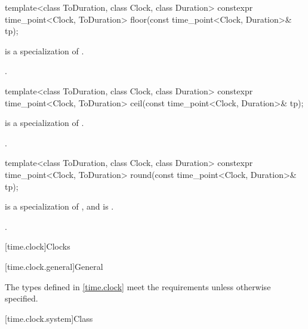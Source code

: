 %
\begin{itemdecl}
template<class ToDuration, class Clock, class Duration>
  constexpr time_point<Clock, ToDuration> floor(const time_point<Clock, Duration>& tp);
\end{itemdecl}

\begin{itemdescr}
\pnum
\constraints
{} is a specialization of .

\pnum
\returns
{}.
\end{itemdescr}

%
\begin{itemdecl}
template<class ToDuration, class Clock, class Duration>
  constexpr time_point<Clock, ToDuration> ceil(const time_point<Clock, Duration>& tp);
\end{itemdecl}

\begin{itemdescr}
\pnum
\constraints
{} is a specialization of .

\pnum
\returns
{}.
\end{itemdescr}

%
\begin{itemdecl}
template<class ToDuration, class Clock, class Duration>
  constexpr time_point<Clock, ToDuration> round(const time_point<Clock, Duration>& tp);
\end{itemdecl}

\begin{itemdescr}
\pnum
\constraints
{} is a specialization of , and
 is .

\pnum
\returns
{}.
\end{itemdescr}

[time.clock]{Clocks}

[time.clock.general]{General}

\pnum
The types defined in \ref{time.clock} meet the
requirements
unless otherwise specified.

[time.clock.system]{Class }

